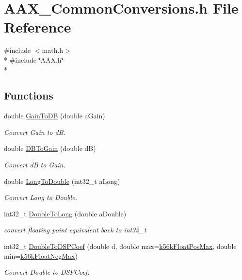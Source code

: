 \hypertarget{a00181}{}\section{A\+A\+X\+\_\+\+Common\+Conversions.\+h File Reference}
\label{a00181}
{\ttfamily \#include $<$math.\+h$>$}\\*
{\ttfamily \#include \char`\"{}A\+A\+X.\+h\char`\"{}}\\*
\subsection*{Functions}
\begin{DoxyCompactItemize}
\item 
double \hyperlink{a00181_a76f29f12e35c093e5c198b8d0e27b6f9}{Gain\+To\+D\+B} (double a\+Gain)
\begin{DoxyCompactList}\small\item\em Convert Gain to d\+B. \end{DoxyCompactList}\item 
double \hyperlink{a00181_a596d5ea393d43f6f798a838aefe3cecd}{D\+B\+To\+Gain} (double d\+B)
\begin{DoxyCompactList}\small\item\em Convert d\+B to Gain. \end{DoxyCompactList}\item 
double \hyperlink{a00181_a463cbd4685551c74125ff89060de20cd}{Long\+To\+Double} (int32\+\_\+t a\+Long)
\begin{DoxyCompactList}\small\item\em Convert Long to Double. \end{DoxyCompactList}\item 
int32\+\_\+t \hyperlink{a00181_a59b4dba8d35a4837ab0afe3886bec74a}{Double\+To\+Long} (double a\+Double)
\begin{DoxyCompactList}\small\item\em convert floating point equivalent back to int32\+\_\+t \end{DoxyCompactList}\item 
int32\+\_\+t \hyperlink{a00181_a1567c2393df9139b20166027d0127195}{Double\+To\+D\+S\+P\+Coef} (double d, double max=\hyperlink{a00181_abc7ad084f4b51c70feeac700ab05f7a5}{k56k\+Float\+Pos\+Max}, double min=\hyperlink{a00181_ae1518eaa8f13def92b4c9daeedbbe002}{k56k\+Float\+Neg\+Max})
\begin{DoxyCompactList}\small\item\em Convert Double to D\+S\+P\+Coef. \end{DoxyCompactList}\item 

\end{DoxyCompactItemize}
